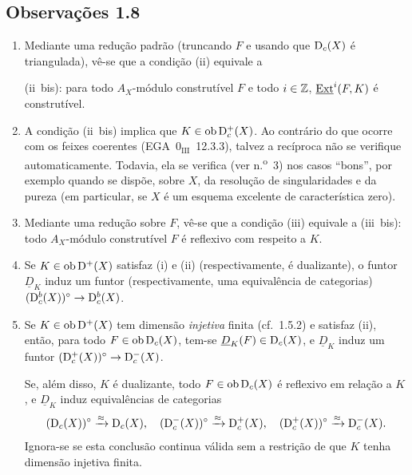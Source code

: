 \subsection*{Observações 1.8}
\begin{enumerate}[label=\alph*)]
\item Mediante uma redução padrão (truncando $F$ e usando que $\mathrm{D}_c(X)$ é triangulada), vê-se que a condição (ii) equivale a

(ii~bis): para todo $A_X$-módulo construtível $F$ e todo $i \in \mathbb{Z}$, $\underline{\operatorname{Ext}}^i(F,K)$ é construtível.

\item A condição (ii~bis) implica que $K \in \operatorname{ob} \mathrm{D}_c^{+}(X)$. Ao contrário do que ocorre com os feixes coerentes (EGA~$0_{\mathrm{III}}$~12.3.3), talvez a recíproca não se verifique automaticamente. Todavia, ela se verifica (ver n.\textsuperscript{o}~3) nos casos ``bons'', por exemplo quando se dispõe, sobre $X$, da resolução de singularidades e da pureza (em particular, se $X$ é um esquema excelente de característica zero).

\item Mediante uma redução sobre $F$, vê-se que a condição (iii) equivale a (iii~bis): todo $A_X$-módulo construtível $F$ é reflexivo com respeito a $K$.

\item Se $K \in \operatorname{ob} \mathrm{D}^{+}(X)$ satisfaz (i) e (ii) (respectivamente, é dualizante), o funtor $\underline{D}_K$ induz um funtor (respectivamente, uma equivalência de categorias) $(\mathrm{D}_c^{b}(X))^{\circ} \to \mathrm{D}_c^{b}(X)$.

\item Se $K \in \operatorname{ob} \mathrm{D}^{+}(X)$ tem dimensão \emph{injetiva} finita (cf.~1.5.2) e satisfaz (ii), então, para todo $F \in \operatorname{ob} \mathrm{D}_c(X)$, tem-se $\underline{D}_K(F) \in \mathrm{D}_c(X)$, e $\underline{D}_K$ induz um funtor $(\mathrm{D}_c^{+}(X))^{\circ} \to \mathrm{D}_c^{-}(X)$.

Se, além disso, $K$ é dualizante, todo $F \in \operatorname{ob} \mathrm{D}_c(X)$ é reflexivo em relação a $K$, e $\underline{D}_K$ induz equivalências de categorias
\[
(\mathrm{D}_c(X))^{\circ} \xrightarrow{\approx} \mathrm{D}_c(X), \quad (\mathrm{D}_c^{-}(X))^{\circ} \xrightarrow{\approx} \mathrm{D}_c^{+}(X), \quad (\mathrm{D}_c^{+}(X))^{\circ} \xrightarrow{\approx} \mathrm{D}_c^{-}(X).
\]
Ignora-se se esta conclusão continua válida sem a restrição de que $K$ tenha dimensão injetiva finita.
\end{enumerate}
